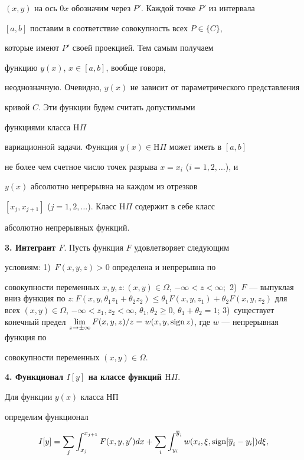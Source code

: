 $(x,y)$ на ось $0x$ обозначим через $P'$. Каждой точке $P'$ из интервала


$[a,b]$ поставим в соответствие совокупность всех $P\in\{C\}$,


которые имеют $P'$ своей проекцией. Тем самым получаем


функцию $y(x)$, $x\in[a,b]$, вообще говоря,


неоднозначную. Очевидно, $y(x)$ не зависит от параметрического представления


кривой $C$. Эти функции будем считать допустимыми


функциями класса $\mathrm H\Pi$


вариационной задачи. Функция $y(x)\in \mathrm H\Pi$ может иметь в $[a,b]$


не более чем счетное число точек разрыва $x=x_i$ ($i=1,2,\dotsc$), и


$y(x)$ абсолютно непрерывна на каждом из отрезков


$[x_j,x_{j+1}]$ ($j=1,2,\dotsc$). Класс $\mathrm H\Pi$ содержит в себе класс


абсолютно непрерывных функций.





{\bf 3. Интегрант $F$}. Пусть функция $F$ удовлетворяет следующим


условиям: 1)~$F(x,y,z) > 0$ определена и непрерывна по


совокупности переменных $x,y,z:(x,y)\in \Omega$, $- \infty <z<


\infty;$ 2)~$F$ --- выпуклая вниз функция по $z:F(x,y, \theta_1z_1+ \theta


_2z_2)\leq \theta_1F(x,y,z_1)+ \theta_2F(x,y,z_2)$ для всех $(x,y)\in


\Omega$, $-\infty <z_1,z_2 < \infty$, $\theta_1, \theta_2\geq0$, $\theta_1+


\theta_2=1$; 3)~существует конечный предел $\lim\limits_{z\to\pm \infty }


F(x,y,z)/z=w(x,y,\sign z)$, где $w$ --- непрерывная функция по


совокупности переменных $(x,y)\in \Omega$.





{\bf 4. Функционал $I[y]$ на классе функций $\mathrm H\Pi$}.


Для функции $y(x)$ класса НП


определим функционал


\begin{equation}


I[y]=\sum_j\int_{x_j}^{x_{j+1}}{F(x,y,y')dx}+ \sum


_i\int_{y_i}^{\overline{y}_i}w(x_i,\xi, \sign


[\overline{y}_i-y_i])d\xi,


\end{equation}


